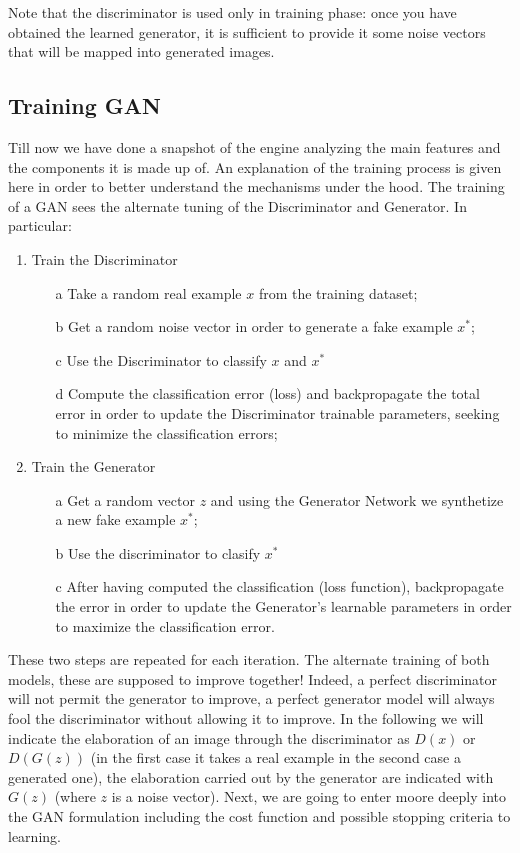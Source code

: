 Note that the discriminator is used only in training phase: once you have obtained the learned generator, it is sufficient to provide it some noise vectors that will be mapped into generated images.

\subsection{Training GAN}
Till now we have done a snapshot of the engine analyzing the main features and the components it is made up of. An explanation of the training process is given here in order to better understand the mechanisms under the hood. The training of a GAN sees the alternate tuning of the Discriminator and Generator. In particular: 
\begin{enumerate}
    \itemsep-0.3em
    \item \textsf{Train the Discriminator}
    \begin{itemize}
        \itemsep-0.3em
        \item[a] Take a random real example $x$ from the training dataset; 
        \item[b] Get a random noise vector in order to generate a fake example $x^*$; 
        \item[c] Use the Discriminator to classify $x$ and $x^*$
        \item[d]  Compute the classification error (loss) and backpropagate the total error in order to update the Discriminator trainable parameters, seeking to minimize the classification errors;   
    \end{itemize}
    \item \textsf{Train the Generator}
    \begin{itemize}
        \itemsep-0.2em
        \item[a] Get a random vector $z$ and using the Generator Network we synthetize a new fake example $x^*$;
        \item[b] Use the discriminator to clasify $x^*$
        \item[c] After having computed the classification (loss function), backpropagate the error in order to update the Generator's learnable parameters in order to maximize the classification error.  
    \end{itemize}
\end{enumerate}
These two steps are repeated for each iteration. The alternate training of both models, these are supposed to improve together! Indeed, a perfect discriminator will not permit the generator to improve, a perfect generator model will always fool the discriminator without allowing it to improve. In the following we will indicate the elaboration of an image through the discriminator as $D(x)$ or $D(G(z))$ (in the first case it takes a real example in the second case a generated one), the elaboration carried out by the generator are indicated with $G(z)$ (where $z$ is a noise vector).
Next, we are going to enter moore deeply into the GAN formulation including the cost function and possible stopping criteria to learning.

